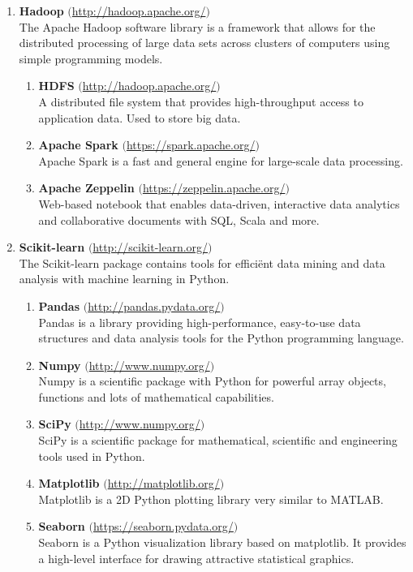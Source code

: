 \begin{enumerate}
    \item \textbf{Hadoop} $($\url{http://hadoop.apache.org/}$)$ \\
    The Apache Hadoop software library is a framework that allows for the distributed processing of large data sets across clusters of computers using simple programming models. 
    \begin{enumerate}
        \item \textbf{HDFS} $($\url{http://hadoop.apache.org/}$)$ \\
        A distributed file system that provides high-throughput access to application data. Used to store big data.
        \item \textbf{Apache Spark} $($\url{https://spark.apache.org/}$)$\\
        Apache Spark is a fast and general engine for large-scale data processing.
        \item \textbf{Apache Zeppelin} $($\url{https://zeppelin.apache.org/}$)$ \\
         Web-based notebook that enables data-driven, interactive data analytics and collaborative documents with SQL, Scala and more.
    \end{enumerate}
    
    \item \textbf{Scikit-learn} $($\url{http://scikit-learn.org/}$)$ \\
    The Scikit-learn package contains tools for effici\"ent data mining and data analysis with machine learning in Python.
    \begin{enumerate}
        \item \textbf{Pandas} $($\url{http://pandas.pydata.org/}$)$ \\
        Pandas is a library providing high-performance, easy-to-use data structures and data analysis tools for the Python programming language.
        \item \textbf{Numpy} $($\url{http://www.numpy.org/}$)$ \\
        Numpy is a scientific package with Python for powerful array objects, functions and lots of mathematical capabilities.
        \item \textbf{SciPy} $($\url{http://www.numpy.org/}$)$ \\
        SciPy is a scientific package for mathematical, scientific and engineering tools used in Python. 
        \item \textbf{Matplotlib} $($\url{http://matplotlib.org/}$)$ \\
        Matplotlib is a 2D Python plotting library very similar to MATLAB.
        \item \textbf{Seaborn} $($\url{https://seaborn.pydata.org/}$)$ \\
        Seaborn is a Python visualization library based on matplotlib. It provides a high-level interface for drawing attractive statistical graphics.
    \end{enumerate}
    

\end{enumerate}
